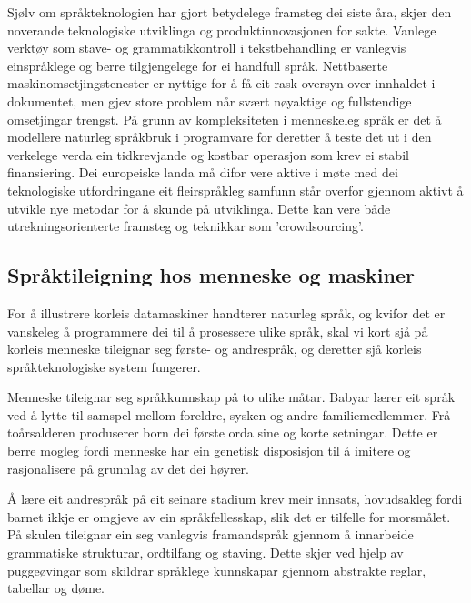 \begin{multicols}{2}
Sjølv om språkteknologien har gjort betydelege framsteg dei siste åra, skjer den noverande teknologiske utviklinga og produktinnovasjonen for sakte. Vanlege verktøy som stave- og grammatikkontroll i tekstbehandling er vanlegvis einspråklege og berre tilgjengelege for ei handfull språk. Nettbaserte maskinomsetjingstenester er nyttige for å få eit rask oversyn over innhaldet i dokumentet, men gjev store problem når svært nøyaktige og fullstendige omsetjingar trengst. På grunn av kompleksiteten i menneskeleg språk er det å modellere naturleg språkbruk i programvare for deretter å teste det ut i den verkelege verda ein tidkrevjande og kostbar operasjon som krev ei stabil finansiering. Dei europeiske landa må difor vere aktive i møte med dei teknologiske utfordringane eit fleirspråkleg samfunn står overfor gjennom aktivt å utvikle nye metodar for å skunde på utviklinga. Dette kan vere både utrekningsorienterte framsteg og teknikkar som 'crowdsourcing'.


\subsection{Språktileigning hos menneske og maskiner}

For å illustrere korleis datamaskiner handterer naturleg språk, og kvifor det er vanskeleg å programmere dei til å prosessere ulike språk, skal vi kort sjå på korleis menneske tileignar seg første- og andrespråk, og deretter sjå korleis språkteknologiske system fungerer.

Menneske tileignar seg språkkunnskap på to ulike måtar. Babyar lærer eit språk ved å lytte til samspel mellom foreldre, sysken og andre familiemedlemmer. Frå toårsalderen produserer born dei første orda sine og korte setningar. Dette er berre mogleg fordi menneske har ein genetisk disposisjon til å imitere og rasjonalisere på grunnlag av det dei høyrer.

Å lære eit andrespråk på eit seinare stadium krev meir innsats, hovudsakleg fordi barnet ikkje er omgjeve av ein språkfellesskap, slik det er tilfelle for morsmålet. På skulen tileignar ein seg vanlegvis framandspråk gjennom å innarbeide grammatiske strukturar, ordtilfang og staving. Dette skjer ved hjelp av puggeøvingar som skildrar språklege kunnskapar gjennom abstrakte reglar, tabellar og døme.



\end{multicols}
